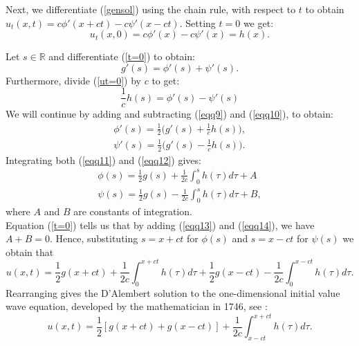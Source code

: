 \documentclass[a4paper, 12pt]{article}
\numberwithin{equation}{section}
\begin{document}
Next, we differentiate (\ref{gensol}) using the chain rule, with respect to $t$
to obtain $u_t(x,t)=c\phi'(x+ct)-c\psi'(x-ct)$. Setting $t=0$ we get:
\begin{equation} \label{ut=0}
    u_t(x,0)=c\phi'(x)-c\psi'(x)=h(x).
\end{equation}

Let $s \in \mathbb{R}$ and differentiate (\ref{t=0}) to obtain:
\begin{equation} \label{eqq9}
    g'(s)=\phi'(s)+\psi'(s).
\end{equation}
Furthermore, divide (\ref{ut=0}) by $c$ to get:
\begin{equation} \label{eqq10}
    \frac{1}{c}h(s)=\phi'(s)-\psi'(s)
\end{equation}
We will continue by adding and subtracting (\ref{eqq9}) and (\ref{eqq10}), to obtain:
\begin{align} \label{eqq11}
    \phi'(s)=\frac{1}{2}\Big(g'(s)+\frac{1}{c}h(s)\Big),\\
    \label{eqq12}
    \psi'(s)=\frac{1}{2}\Big(g'(s)-\frac{1}{c}h(s)\Big).
\end{align}
Integrating both (\ref{eqq11}) and (\ref{eqq12}) gives:
\begin{align} \label{eqq13}
    \phi(s)=\frac{1}{2}g(s)+\frac{1}{2c}\int^s_0h(\tau)d\tau+A\\
    \label{eqq14}
    \psi(s)=\frac{1}{2}g(s)-\frac{1}{2c}\int^s_0h(\tau)d\tau+B,
\end{align}
where $A$ and $B$ are constants of integration. \\

Equation (\ref{t=0}) tells us that by adding (\ref{eqq13}) and (\ref{eqq14}), we
have $A+B=0$. Hence, substituting $s=x+ct$ for $\phi(s)$ and $s=x-ct$ for $\psi(s)$ we
obtain that
\begin{equation*}
    u(x,t)=\frac{1}{2}g(x+ct)+\frac{1}{2c}\int^{x+ct}_0h(\tau)d\tau+\frac{1}{2}g(x-ct)-\frac{1}{2c}\int^{x-ct}_0h(\tau)d\tau.
\end{equation*}
Rearranging gives the D'Alembert solution to the one-dimensional initial value
wave equation, developed by the mathematician in 1746, see \cite[Ch. 2.1]{Str}:
\begin{equation} \label{DAla}
    u(x,t)=\frac{1}{2}\left[g(x+ct)+g(x-ct)\right]+\frac{1}{2c}\int^{x+ct}_{x-ct}h(\tau)d\tau.
\end{equation}
\end{document}
